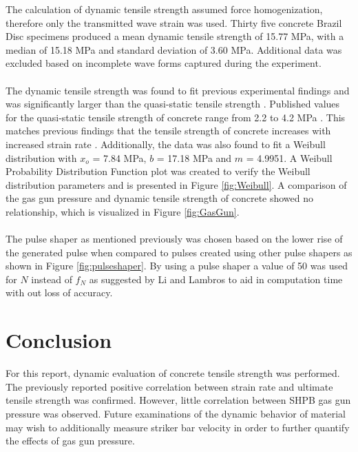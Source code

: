 \documentclass[12pt]{article}
\begin{document}
The calculation of dynamic tensile strength assumed force homogenization, therefore only the transmitted wave strain was used. Thirty five concrete Brazil Disc specimens produced a mean dynamic tensile strength of 15.77 MPa, with a median of 15.18 MPa and standard deviation of 3.60 MPa. Additional data was excluded based on incomplete wave forms captured during the experiment. 
\\ \\
The dynamic tensile strength was found to fit previous experimental findings and was significantly larger than the quasi-static tensile strength \cite{Jin2017}. Published values for the quasi-static tensile strength of concrete range from 2.2 to 4.2 MPa \cite{Concrete}. This matches previous findings that the tensile strength of concrete increases with increased strain rate \cite{Jin2017} \cite{Grote}. Additionally, the data was also found to fit a Weibull distribution with $x_{o}$ = 7.84 MPa, $b$ = 17.18 MPa and $m$ = 4.9951. A Weibull Probability Distribution Function plot was created to verify the Weibull distribution parameters and is presented in Figure \ref{fig:Weibull}. A comparison of the gas gun pressure and dynamic tensile strength of concrete showed no relationship, which is visualized in Figure \ref{fig:GasGun}.  
\\ \\
The pulse shaper as mentioned previously was chosen based on the lower rise of the generated pulse when compared to pulses created using other pulse shapers as shown in Figure \ref{fig:pulseshaper}. By using a pulse shaper a value of 50 was used for $N$ instead of $f_N$ as suggested by Li and Lambros \cite{Li} to aid in computation time with out loss of accuracy.

\section{Conclusion} %

For this report, dynamic evaluation of concrete tensile strength was performed. The previously reported positive correlation between strain rate and ultimate tensile strength was confirmed. However, little correlation between SHPB gas gun pressure was observed. Future examinations of the dynamic behavior of material may wish to additionally measure striker bar velocity in order to further quantify the effects of gas gun pressure. 
\end{document}
